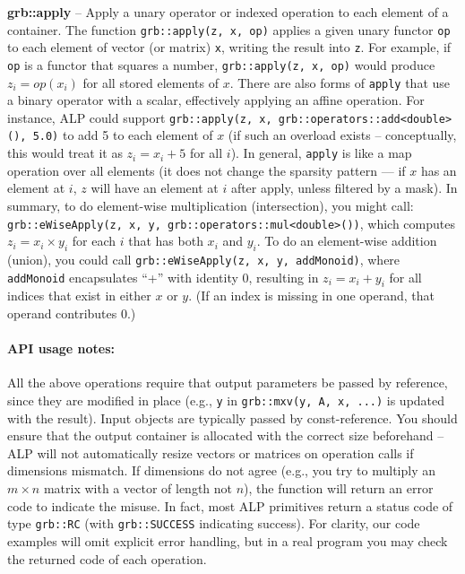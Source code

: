       \textbf{grb::apply} – Apply a unary operator or indexed operation to each element of a container. The function \texttt{grb::apply(z, x, op)} applies a given unary functor \texttt{op} to each element of vector (or matrix) \texttt{x}, writing the result into \texttt{z}. For example, if \texttt{op} is a functor that squares a number, \texttt{grb::apply(z, x, op)} would produce $z_i = \textit{op}(x_i)$ for all stored elements of $x$. There are also forms of \texttt{apply} that use a binary operator with a scalar, effectively applying an affine operation. For instance, ALP could support \texttt{grb::apply(z, x, grb::operators::add<double>(), 5.0)} to add 5 to each element of $x$ (if such an overload exists – conceptually, this would treat it as $z_i = x_i + 5$ for all $i$). In general, \texttt{apply} is like a map operation over all elements (it does not change the sparsity pattern — if $x$ has an element at $i$, $z$ will have an element at $i$ after apply, unless filtered by a mask).
    In summary, to do element-wise multiplication (intersection), you might call:
    \texttt{grb::eWiseApply(z, x, y, grb::operators::mul<double>())},
    which computes $z_i = x_i \times y_i$ for each $i$ that has both $x_i$ and $y_i$. To do an element-wise addition (union), you could call
    \texttt{grb::eWiseApply(z, x, y, addMonoid)}, where \texttt{addMonoid} encapsulates “+” with identity 0, resulting in $z_i = x_i + y_i$ for all indices that exist in either $x$ or $y$. (If an index is missing in one operand, that operand contributes 0.)

\paragraph{API usage notes:} All the above operations require that output parameters be passed by reference, since they are modified in place (e.g., \texttt{y} in \texttt{grb::mxv(y, A, x, ...)} is updated with the result). Input objects are typically passed by const-reference. You should ensure that the output container is allocated with the correct size beforehand – ALP will not automatically resize vectors or matrices on operation calls if dimensions mismatch. If dimensions do not agree (e.g., you try to multiply an $m\times n$ matrix with a vector of length not $n$), the function will return an error code to indicate the misuse. In fact, most ALP primitives return a status code of type \texttt{grb::RC} (with \texttt{grb::SUCCESS} indicating success). For clarity, our code examples will omit explicit error handling, but in a real program you may check the returned code of each operation.


